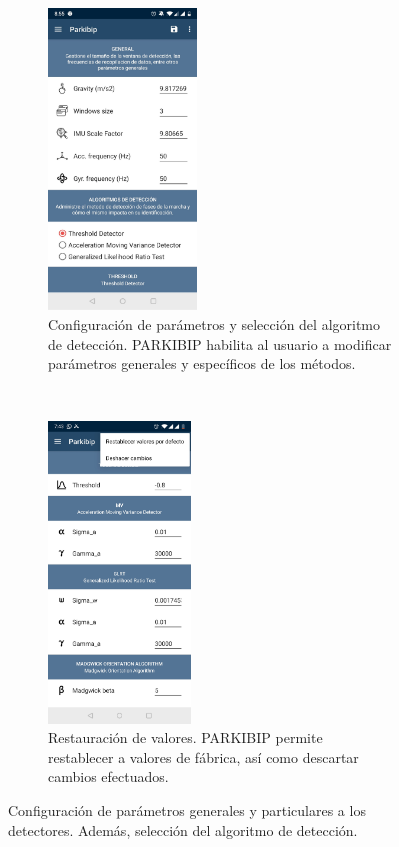 \begin{figure}[!h]
     \centering
     \begin{subfigure}[t]{0.4\textwidth}
         \centering
         \includegraphics[height=8cm]{TESIS/imagenes/chap05/activity-configuration.JPG}
         \caption{Configuración de parámetros y selección del algoritmo de detección. PARKIBIP habilita al usuario a modificar parámetros generales y específicos de los métodos.}
     \end{subfigure}
     ~
     \begin{subfigure}[t]{0.4\textwidth}
         \centering
         \includegraphics[height=8cm]{TESIS/imagenes/chap05/activity-configuration2.JPG}
         \caption{Restauración de valores. PARKIBIP permite restablecer a valores de fábrica, así como descartar cambios efectuados.}
     \end{subfigure}
     \caption{Configuración de parámetros generales y particulares a los detectores. Además, selección del algoritmo de detección.}
     \label{fig:activity-configuration}
 \end{figure}

